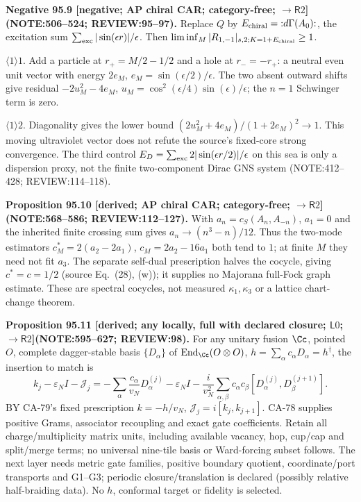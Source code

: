 \textbf{Negative 95.9 [negative; AP chiral CAR; category-free; \(\to\mathsf R2\)] (NOTE:506--524; REVIEW:95--97).}
Replace \(Q\) by \(E_{\rm chiral}={:}d\Gamma(A_0){:}\), the excitation sum \(\sum_{\rm exc}|\sin(\epsilon r)|/\epsilon\).
Then \(\liminf_M|R_{1,-1}|_{s,2;K=1+E_{\rm chiral}}\ge1\).
\par\(\langle1\rangle1\). Add a particle at \(r_+=M/2-1/2\) and a hole at \(r_-=-r_+\): a neutral even unit vector
with energy \(2e_M\), \(e_M=\sin(\epsilon/2)/\epsilon\). The two absent outward shifts give residual
\(-2u_M^2-4e_M\), \(u_M=\cos^2(\epsilon/4)\sin(\epsilon)/\epsilon\); the \(n=1\) Schwinger term is zero.
\par\(\langle1\rangle2\). Diagonality gives the lower bound \((2u_M^2+4e_M)/(1+2e_M)^2\to1\).
This moving ultraviolet vector does not refute the source's fixed-core strong convergence.
The third control \(E_D=\sum_{\rm exc}2|\sin(\epsilon r/2)|/\epsilon\) on this sea is only a dispersion proxy,
not the finite two-component Dirac GNS system (NOTE:412--428; REVIEW:114--118).

\textbf{Proposition 95.10 [derived; AP chiral CAR; category-free; \(\to\mathsf R2\)] (NOTE:568--586; REVIEW:112--127).}
With \(a_n=c_S(A_n,A_{-n})\), \(a_1=0\) and the inherited finite crossing sum gives
\(a_n\to(n^3-n)/12\). Thus the two-mode estimators \(c_M^*=2(a_2-2a_1)\), \(c_M=2a_2-16a_1\)
both tend to \(1\); at finite \(M\) they need not fit \(a_3\). The separate self-dual prescription halves the
cocycle, giving \(c^*=c=1/2\) (source Eq.~(28), (w)); it supplies no Majorana full-Fock graph estimate.
These are spectral cocycles, not measured \(\kappa_1,\kappa_3\) or a lattice chart-change theorem.

\textbf{Proposition 95.11 [derived; any locally, full with declared closure; \(\mathsf L0\); \(\to\mathsf R2\)]\newline (NOTE:595--627; REVIEW:98).}
For any unitary fusion \(\Cc\), pointed \(O\), complete dagger-stable basis \(\{D_\alpha\}\) of
\(\operatorname{End}_{\Cc}(O\otimes O)\), \(h=\sum_\alpha c_\alpha D_\alpha=h^\dagger\), the insertion to match is
\[
 k_j-\varepsilon_N I-\mathcal J_j=-\sum_\alpha\frac{c_\alpha}{v_N}D_\alpha^{(j)}-\varepsilon_N I
 -\frac{i}{v_N^2}\sum_{\alpha,\beta}c_\alpha c_\beta[D_\alpha^{(j)},D_\beta^{(j+1)}].
\]
BY CA-79's fixed prescription \(k=-h/v_N\), \(\mathcal J_j=i[k_j,k_{j+1}]\). CA-78 supplies positive Grams,
associator recoupling and exact gate coefficients. Retain all charge/multiplicity matrix units, including available
vacancy, hop, cup/cap and split/merge terms; no universal nine-tile basis or Ward-forcing subset follows.
The next layer needs metric gate families, positive boundary quotient, coordinate/port transports and G1--G3;
periodic closure/translation is declared (possibly relative half-braiding data). No \(h\), conformal target or fidelity is selected.

